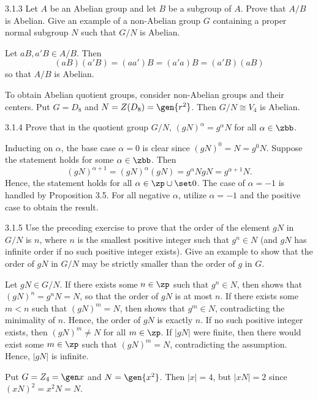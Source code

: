 \begin{exercise}{3.1.3}
    Let $A$ be an Abelian group and let $B$ be a subgroup of $A$.
	Prove that $A/B$ is Abelian.
	Give an example of a non-Abelian group $G$ containing a proper normal subgroup $N$ such that $G/N$ is Abelian.
\end{exercise}

\begin{sol}
    Let $aB, a'B \in A/B$.
	Then
    \[
    	(aB)(a'B) = (aa')B = (a'a)B = (a'B)(aB)
    \]
    so that $A/B$ is Abelian.

    To obtain Abelian quotient groups, consider non-Abelian groups and their centers.
	Put $G = D_8$ and $N = Z(D_8) = \gen{r^2}$.
	Then $G/N \cong V_4$ is Abelian.
\end{sol}

\begin{exercise}{3.1.4}
    Prove that in the quotient group $G/N$, $(gN)^{\alpha} = g^{\alpha}N$ for all $\alpha \in \zbb$.
\end{exercise}

\begin{sol}
    Inducting on $\alpha$, the base case $\alpha = 0$ is clear since $(gN)^0 = N = g^0N$.
	Suppose the statement holds for some $\alpha \in \zbb$.
	Then
    \[
    	(gN)^{\alpha + 1} = (gN)^{\alpha}(gN) = g^{\alpha}N gN = g^{\alpha + 1}N.
    \]
    Hence, the statement holds for all $\alpha \in \zp \cup \set 0$.
	The case of $\alpha = -1$ is handled by Proposition 3.5.
	For all negative $\alpha$, utilize $\alpha = -1$ and the positive case to obtain the result.
\end{sol}

\begin{exercise}{3.1.5}
    Use the preceding exercise to prove that the order of the element $gN$ in $G/N$ is $n$, where $n$ is the smallest positive integer such that $g^n \in N$ (and $gN$ has infinite order if no such positive integer exists).
	Give an example to show that the order of $gN$ in $G/N$ may be strictly smaller than the order of $g$ in $G$.
\end{exercise}

\begin{sol}
    Let $gN \in G/N$.
	If there exists some $n \in \zp$ such that $g^n \in N$, then  shows that $(gN)^n = g^nN = N$, so that the order of $gN$ is at most $n$.
	If there exists some $m < n$ such that $(gN)^m = N$, then  shows that $g^m \in N$, contradicting the minimality of $n$.
	Hence, the order of $gN$ is exactly $n$.
	If no such positive integer exists, then $(gN)^m \neq N$ for all $m \in \zp$.
	If $|gN|$ were finite, then there would exist some $m \in \zp$ such that $(gN)^m = N$, contradicting the assumption.
	Hence, $|gN|$ is infinite.

    Put $G = Z_4 = \gen x$ and $N = \gen{x^2}$.
	Then $|x| = 4$, but $|xN| = 2$ since $(xN)^2 = x^2N = N$.
\end{sol}

